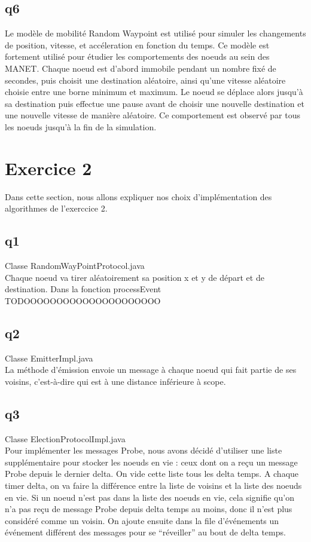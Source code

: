 \documentclass[paper=a4, fontsize=11pt]{report} %
\begin{document}
\subsection{q6}

Le modèle de mobilité Random Waypoint est utilisé pour simuler les changements de position, vitesse, et accéleration en fonction du temps. Ce modèle est fortement utilisé
pour étudier les comportements des noeuds au sein des MANET. Chaque noeud est d'abord immobile pendant un nombre fixé de secondes, puis choisit une destination aléatoire, ainsi qu'une vitesse aléatoire choisie entre une borne
minimum et maximum. Le noeud se déplace alors jusqu'à sa destination puis effectue une pause avant de choisir une nouvelle destination et une nouvelle vitesse de manière aléatoire. Ce comportement est observé par tous les noeuds jusqu'à 
la fin de la simulation.

\section{Exercice 2}
Dans cette section, nous allons expliquer nos choix d'implémentation des algorithmes de l'exerccice 2.

\subsection{q1}
Classe RandomWayPointProtocol.java \\
Chaque noeud va tirer aléatoirement sa position x et y de départ et de destination. 
Dans la fonction processEvent TODOOOOOOOOOOOOOOOOOOOOO

\subsection{q2}
Classe EmitterImpl.java\\
La méthode d'émission envoie un message à chaque noeud qui fait partie de ses voisins, c'est-à-dire qui est à une distance inférieure à scope.

\subsection{q3}
Classe ElectionProtocolImpl.java \\
Pour implémenter les messages Probe, nous avons décidé d'utiliser une liste supplémentaire pour stocker les noeuds en vie : ceux dont on a reçu un message Probe depuis le dernier delta. On vide cette liste tous les delta temps.
A chaque timer delta, on va faire la différence entre la liste de voisins et la liste des noeuds en vie. Si un noeud n'est pas dans la liste des noeuds en vie, cela signifie qu'on n'a pas reçu de message Probe depuis delta temps au moins, donc il n'est plus considéré comme un voisin.
On ajoute ensuite dans la file d'événements un événement différent des messages pour se \enquote{réveiller} au bout de delta temps.
\end{document}
